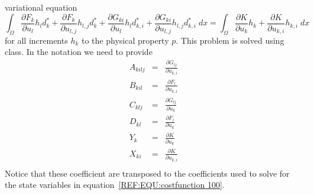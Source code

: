 variational equation
\begin{equation}\label{REF:EQU:costfunction 100dd}
 \int_{\Omega} 
\displaystyle{\frac{\partial F_k }{\partial u_l }  } h_l d^*_k +
\displaystyle{\frac{\partial F_k }{\partial u_{l,j}} } h_{l,j} d^*_k +
\displaystyle{\frac{\partial G_{ki}}{\partial u_l} } h_l d^*_{k,i} +
\displaystyle{\frac{\partial G_{ki}}{\partial u_{l,j}} } h_{l,j} d^*_{k,i}
\; dx
= \int_{\Omega} 
\displaystyle{\frac{\partial K }{\partial u_k }  } h_k +
\displaystyle{\frac{\partial K }{\partial u_{k,i} }  } h_{k,i}  \; dx
\end{equation}
for all increments $h_k$ to the physical property $p$. This problem
is solved using \escript {} class. In the \escript notation we need to provide 
\begin{equation}\label{ref:EQU:REG:600b}
\begin{array}{rcl}
 A_{kilj} & = &  \displaystyle{\frac{\partial G_{lj}}{\partial u_{k,i}} }  \\
 B_{kil} & = &  \displaystyle{\frac{\partial F_l }{\partial u_{k,i}} }   \\
 C_{klj} & = & \displaystyle{\frac{\partial G_{lj}}{\partial u_k} }    \\
  D_{kl} & = & \displaystyle{\frac{\partial F_l }{\partial u_k }  }   \\ 
  Y_{k} & = & \displaystyle{\frac{\partial K }{\partial u_k }  }     \\ 
  X_{ki} & = & \displaystyle{\frac{\partial K }{\partial u_{k,i} }  }    \\ 
\end{array}
\end{equation} 
Notice that these coefficient are transposed to the coefficients used to solve for the 
state variables in equation~\ref{REF:EQU:costfunction 100}. 

